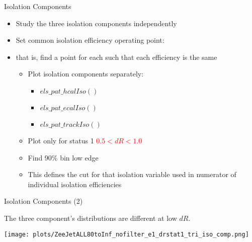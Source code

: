 \documentclass{beamer}
\begin{document}
\begin{frame}{Isolation Components}

  \begin{itemize}
  \item Study the three isolation components independently
  \item Set common isolation efficiency operating point: 
  \item that is, find a point for each such that each efficiency is the same
    \begin{itemize}
    \item Plot isolation components separately:
      \begin{itemize}
      \item $els\_pat\_hcalIso()$
      \item $els\_pat\_ecalIso()$
      \item $els\_pat\_trackIso()$
      \end{itemize}
    \item Plot only for status 1 \textcolor{red}{$0.5 < dR < 1.0$}
    \item Find 90\% bin low edge
    \item This defines the cut for that isolation variable used in numerator of individual isolation efficiencies
    \end{itemize}
  \end{itemize}


\end{frame}


\begin{frame}{Isolation Components (2)}
  \begin{center}
    The three component's distributions are different at low $dR$.\\ \bigskip

    \texttt{[image: plots/ZeeJetALL80toInf\_nofilter\_e1\_drstat1\_tri\_iso\_comp.png]}
  \end{center}
\end{frame}
\end{document}
